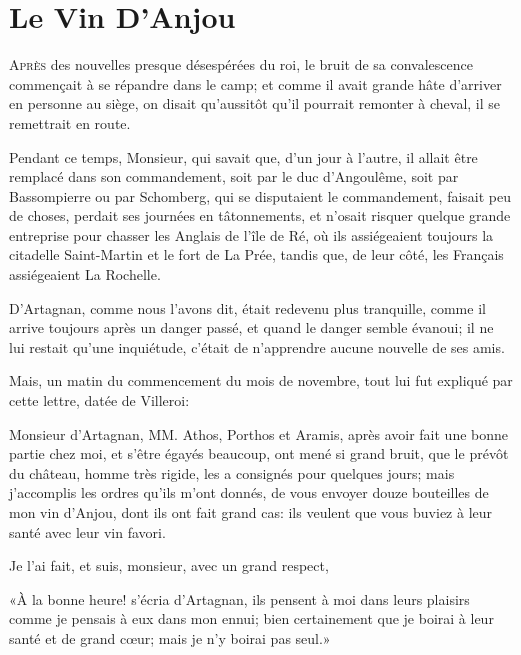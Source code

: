 
\chapter{Le Vin D'Anjou}

\lettrine{A}{près} des nouvelles presque désespérées du roi, le bruit de sa convalescence commençait à se répandre dans le camp; et comme il avait grande hâte d'arriver en personne au siège, on disait qu'aussitôt qu'il pourrait remonter à cheval, il se remettrait en route. 

Pendant ce temps, Monsieur, qui savait que, d'un jour à l'autre, il allait être remplacé dans son commandement, soit par le duc d'Angoulême, soit par Bassompierre ou par Schomberg, qui se disputaient le commandement, faisait peu de choses, perdait ses journées en tâtonnements, et n'osait risquer quelque grande entreprise pour chasser les Anglais de l'île de Ré, où ils assiégeaient toujours la citadelle Saint-Martin et le fort de La Prée, tandis que, de leur côté, les Français assiégeaient La Rochelle. 

D'Artagnan, comme nous l'avons dit, était redevenu plus tranquille, comme il arrive toujours après un danger passé, et quand le danger semble évanoui; il ne lui restait qu'une inquiétude, c'était de n'apprendre aucune nouvelle de ses amis. 

Mais, un matin du commencement du mois de novembre, tout lui fut expliqué par cette lettre, datée de Villeroi: 
\begin{mail}{}{Monsieur d'Artagnan,} 
	MM. Athos, Porthos et Aramis, après avoir fait une bonne partie chez moi, et s'être égayés beaucoup, ont mené si grand bruit, que le prévôt du château, homme très rigide, les a consignés pour quelques jours; mais j'accomplis les ordres qu'ils m'ont donnés, de vous envoyer douze bouteilles de mon vin d'Anjou, dont ils ont fait grand cas: ils veulent que vous buviez à leur santé avec leur vin favori.
	
	Je l'ai fait, et suis, monsieur, avec un grand respect,
	
	\end{mail}

«À la bonne heure! s'écria d'Artagnan, ils pensent à moi dans leurs plaisirs comme je pensais à eux dans mon ennui; bien certainement que je boirai à leur santé et de grand cœur; mais je n'y boirai pas seul.» 

